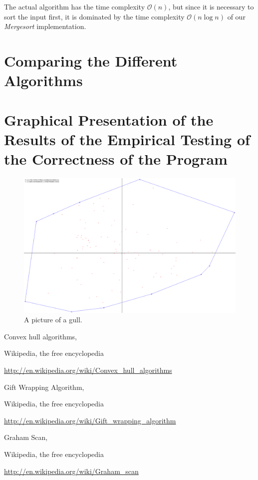 \documentclass[a4paper,12pt,leqno,titlepage]{article}
\newcommand{\bigO}{\mathcal{O}}
\begin{document}
The actual algorithm has the time complexity $\bigO(n)$, but since it is necessary to sort the input first,
it is dominated by the time complexity $\bigO(n\log n)$ of our \emph{Mergesort} implementation. 

\pagebreak
\section{Comparing the Different Algorithms}

\pagebreak
\section{Graphical Presentation of the Results of the Empirical Testing of the Correctness of the Program}
\begin{figure}[h!]
\caption{A picture of a gull.} %
\centering
\includegraphics[width=\textwidth]{gull.png}
\end{figure}

\pagebreak


\begin{thebibliography}{9}

Convex hull algorithms,

Wikipedia, the free encyclopedia

\url{http://en.wikipedia.org/wiki/Convex_hull_algorithms}

Gift Wrapping Algorithm,

Wikipedia, the free encyclopedia

\url{http://en.wikipedia.org/wiki/Gift_wrapping_algorithm}

Graham Scan,

Wikipedia, the free encyclopedia

\url{http://en.wikipedia.org/wiki/Graham_scan}

\end{thebibliography}
\end{document}
